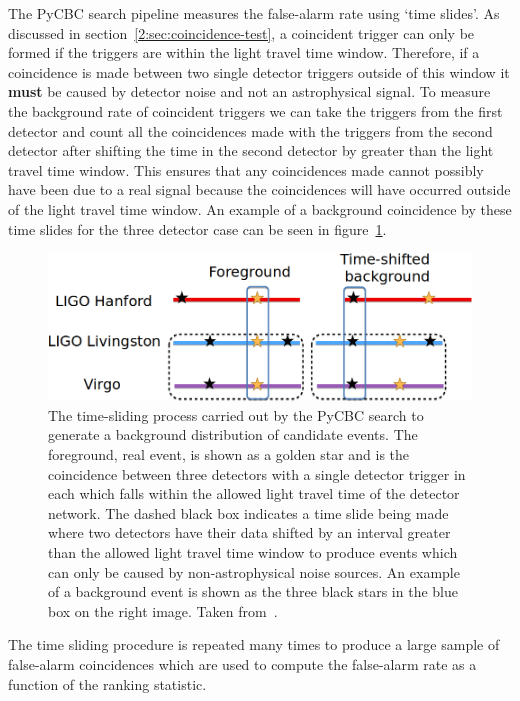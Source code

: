 The PyCBC search pipeline measures the false-alarm rate using `time slides'. As discussed in section~\ref{2:sec:coincidence-test}, a coincident trigger can only be formed if the triggers are within the light travel time window. Therefore, if a coincidence is made between two single detector triggers outside of this window it \textbf{must} be caused by detector noise and not an astrophysical signal. To measure the background rate of coincident triggers we can take the triggers from the first detector and count all the coincidences made with the triggers from the second detector after shifting the time in the second detector by greater than the light travel time window. This ensures that any coincidences made cannot possibly have been due to a real signal because the coincidences will have occurred outside of the light travel time window. An example of a background coincidence by these time slides for the three detector case can be seen in figure~\ref{2:fig:timeslides}.
%
\begin{figure}
    \centering
    \includegraphics[width=0.9\linewidth]{images/2_searches/TimeslideExample.png}
    \caption{The time-sliding process carried out by the PyCBC search to generate a background distribution of candidate events. The foreground, real \gwadj event, is shown as a golden star and is the coincidence between three detectors with a single detector trigger in each which falls within the allowed light travel time of the detector network. The dashed black box indicates a time slide being made where two detectors have their data shifted by an interval greater than the allowed light travel time window to produce events which can only be caused by non-astrophysical noise sources. An example of a background event is shown as the three black stars in the blue box on the right image. Taken from~\cite{PyCBC_global:2020}.}
    \label{2:fig:timeslides}
\end{figure}
%

The time sliding procedure is repeated many times to produce a large sample of false-alarm coincidences which are used to compute the false-alarm rate as a function of the ranking statistic.

